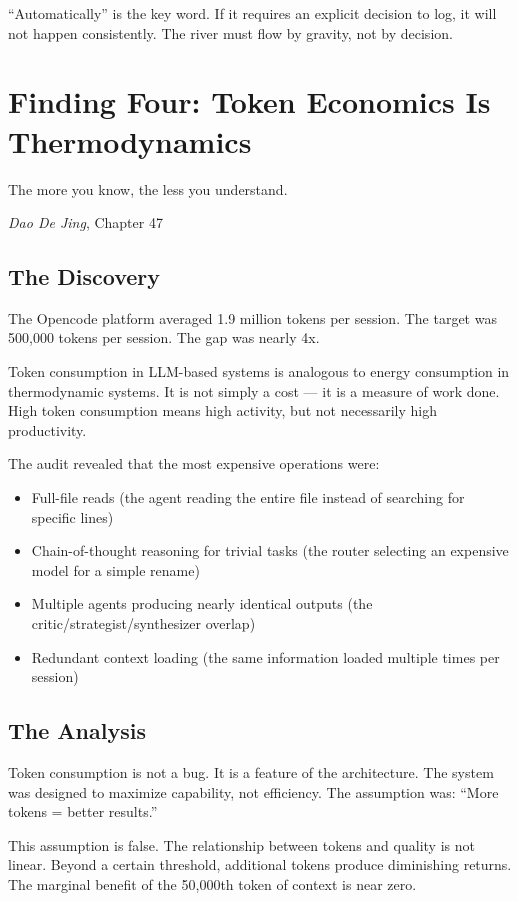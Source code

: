 \documentclass[12pt,a4paper,oneside]{book}
\begin{document}
\enquote{Automatically} is the key word. If it requires an explicit decision to log, it will not happen consistently. The river must flow by gravity, not by decision.

\chapter{Finding Four: Token Economics Is Thermodynamics}

\epigraph{The more you know, the less you understand.}{\textit{Dao De Jing}, Chapter 47}

\section{The Discovery}

The Opencode platform averaged 1.9 million tokens per session. The target was 500,000 tokens per session. The gap was nearly 4x.

Token consumption in LLM-based systems is analogous to energy consumption in thermodynamic systems. It is not simply a cost --- it is a measure of work done. High token consumption means high activity, but not necessarily high productivity.

The audit revealed that the most expensive operations were:
\begin{itemize}
  \item Full-file reads (the agent reading the entire file instead of searching for specific lines)
  \item Chain-of-thought reasoning for trivial tasks (the router selecting an expensive model for a simple rename)
  \item Multiple agents producing nearly identical outputs (the critic/strategist/synthesizer overlap)
  \item Redundant context loading (the same information loaded multiple times per session)
\end{itemize}

\section{The Analysis}

Token consumption is not a bug. It is a feature of the architecture. The system was designed to maximize capability, not efficiency. The assumption was: \enquote{More tokens = better results.}

This assumption is false. The relationship between tokens and quality is not linear. Beyond a certain threshold, additional tokens produce diminishing returns. The marginal benefit of the 50,000th token of context is near zero.
\end{document}
